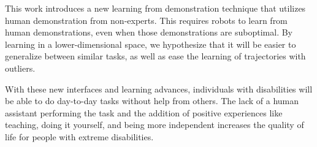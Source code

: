 \documentclass{sig-alternate-2013}
\begin{document}

This work introduces a new learning from demonstration technique that utilizes human demonstration from non-experts. This requires robots to learn from human demonstrations, even when those demonstrations are suboptimal. By learning in a lower-dimensional space, we hypothesize that it will be easier to generalize between similar tasks, as well as ease the learning of trajectories with outliers.



With these new interfaces and learning advances, individuals with disabilities will be able to do day-to-day tasks without help from others. The lack of a human assistant performing the task and the addition of positive experiences like teaching, doing it yourself, and being more independent increases the quality of life for people with extreme disabilities.

\end{document}
